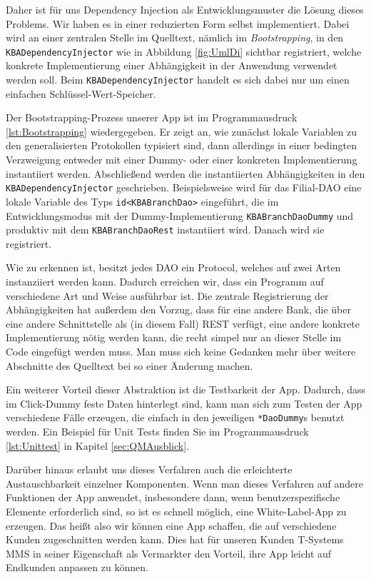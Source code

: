 	Daher ist für uns Dependency Injection als Entwicklungsmuster die Lösung dieses Problems. Wir haben es in einer reduzierten Form selbst implementiert. Dabei wird an einer zentralen Stelle im Quelltext, nämlich im \emph{Bootstrapping}, in den \lstinline{KBADependencyInjector} wie in Abbildung \ref{fig:UmlDi} sichtbar registriert, welche konkrete Implementierung einer Abhängigkeit in der Anwendung verwendet werden soll. Beim \lstinline{KBADependencyInjector} handelt es sich dabei nur um einen einfachen Schlüssel-Wert-Speicher.
	
	Der Bootstrapping-Prozess unserer App ist im Programmausdruck \ref{lst:Bootstrapping} wiedergegeben. Er zeigt an, wie zunächst lokale Variablen zu den generalisierten Protokollen typisiert sind, dann allerdings in einer bedingten Verzweigung entweder mit einer Dummy- oder einer konkreten Implementierung instantiiert werden. Abschließend werden die instantiierten Abhängigkeiten in den \lstinline{KBADependencyInjector} geschrieben. Beispielsweise wird für das Filial-\ac{DAO} eine lokale Variable des Typs \lstinline{id<KBABranchDao>} eingeführt, die im Entwicklungsmodus mit der Dummy-Implementierung \lstinline{KBABranchDaoDummy} und produktiv mit dem \lstinline{KBABranchDaoRest} instantiiert wird. Danach wird sie registriert.
	\pagebreak
	
	
\noindent	Wie zu erkennen ist, besitzt jedes \ac{DAO} ein Protocol, welches auf zwei Arten instanziiert werden kann. Dadurch erreichen wir, dass ein Programm auf verschiedene Art und Weise ausführbar ist. Die zentrale Registrierung der Abhängigkeiten hat außerdem den Vorzug, dass für eine andere Bank, die über eine andere Schnittstelle als (in diesem Fall) \ac{REST} verfügt, eine andere konkrete Implementierung nötig werden kann, die recht simpel nur an dieser Stelle im Code eingefügt werden muss. Man muss sich keine Gedanken mehr über weitere Abschnitte des Quelltext bei so einer Änderung machen.
	
	Ein weiterer Vorteil dieser Abstraktion ist die Testbarkeit der App. Dadurch, dass im Click-Dummy feste Daten hinterlegt sind, kann man sich zum Testen der App verschiedene Fälle erzeugen, die einfach in den jeweiligen \lstinline{*DaoDummy}s benutzt werden. Ein Beispiel für Unit Tests finden Sie im Programmausdruck \ref{lst:Unittest} in Kapitel \ref{sec:QMAusblick}.
	
	Darüber hinaus erlaubt uns dieses Verfahren auch die erleichterte Austauschbarkeit einzelner Komponenten. Wenn man dieses Verfahren auf andere Funktionen der App anwendet, insbesondere dann, wenn benutzerspezifische Elemente erforderlich sind, so ist es schnell möglich, eine White-Label-App zu erzeugen. Das heißt also wir können eine App schaffen, die auf verschiedene Kunden zugeschnitten werden kann. Dies hat für unseren Kunden T-Systems MMS in seiner Eigenschaft als Vermarkter den Vorteil, ihre App leicht auf Endkunden anpassen zu können.
	
